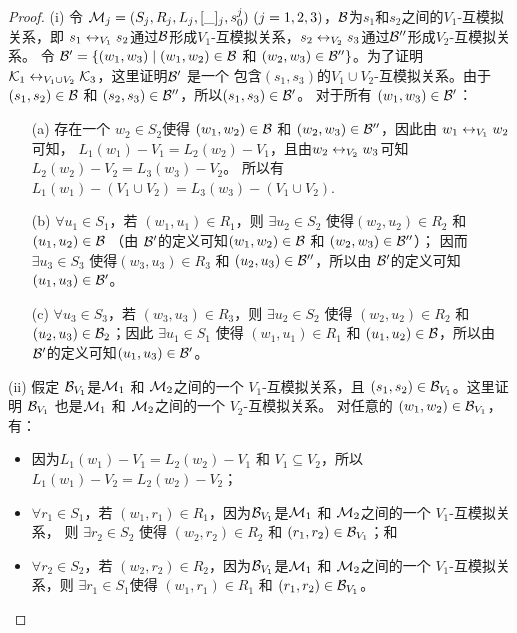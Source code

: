 \begin{proof}
	(i) 令 ${\cal M}_j=(S_j,R_j,L_j,[\_]_j,s_0^j)~(j=1,2,3)$，${\cal B}$为$s_1$和$s_2$之间的$V_1$-互模拟关系，即 $s_1 \leftrightarrow_{V_1} s_2$通过${\cal B}$形成$V_1$-互模拟关系，$s_2 \leftrightarrow_{V_2} s_3$通过${\cal B}''$形成$V_2$-互模拟关系。 令 ${\cal B}' = \{(w_1, w_3)\mid (w_1, w_2)\in {\cal B}$ 和 $(w_2, w_3)\in {\cal B}''\}$。为了证明 ${\cal K}_1\leftrightarrow_{V_1\cup V_2}{\cal K}_3$，这里证明${\cal B}'$ 是一个 包含$(s_1, s_3)$的$V_1 \cup V_2$-互模拟关系。由于$(s_1,s_2)\in {\cal B}$ 和 $(s_2, s_3)\in {\cal B}''$，所以$(s_1, s_3) \in {\cal B}'$。
	对于所有 $(w_1, w_3) \in {\cal B}'$：
	\begin{itemize}
		\item[(a)] 存在一个 $w_2 \in S_2$使得 $(w_1,w_2)\in {\cal B}$ 和 $(w_2, w_3)\in {\cal B}''$，因此由 $w_1 \leftrightarrow_{V_1} w_2$可知， $L_1(w_1)-V_1 = L_2(w_2) - V_1$，且由$w_2 \leftrightarrow_{V_2} w_3$可知 $L_2(w_2) - V_2 = L_3(w_3) - V_2$。
		所以有 $L_1(w_1) - (V_1 \cup V_2) = L_3(w_3) - (V_1 \cup V_2)$.
		\item[(b)] $\forall u_1\in S_1$，若 $(w_1, u_1) \in R_1$，则 $\exists u_2\in S_2$ 使得$(w_2, u_2) \in R_2$ 和 $(u_1,u_2)\in {\cal B}$ （由 ${\cal B}'$的定义可知$(w_1,w_2)\in {\cal B}$ 和 $(w_2, w_3) \in {\cal B}''$）； 因而 $\exists u_3 \in S_3$ 使得$(w_3, u_3) \in R_3$ 和 $(u_2, u_3) \in {\cal B}''$，所以由 ${\cal B}'$的定义可知 $(u_1, u_3) \in {\cal B}'$。
		\item[(c)] $\forall u_3\in S_3$，若 $(w_3, u_3) \in R_3$，则 $\exists u_2\in S_2$ 使得 $(w_2, u_2) \in R_2$ 和 $(u_2, u_3) \in {\cal B}_2$；因此 $\exists u_1 \in S_1$ 使得  $(w_1, u_1) \in R_1$ 和 $(u_1, u_2) \in {\cal B}$，所以由 ${\cal B}'$的定义可知$(u_1, u_3) \in {\cal B}'$。
	\end{itemize}
	
	(ii) 假定 ${\cal B}_{V_1}$是${\cal M}_1$ 和 ${\cal M}_2$之间的一个 $V_1$-互模拟关系，且 $(s_1, s_2)\in {\cal B}_{V_1}$。这里证明 ${\cal B}_{V_1}$ 也是${\cal M}_1$ 和 ${\cal M}_2$之间的一个 $V_2$-互模拟关系。
	对任意的 $(w_1, w_2) \in {\cal B}_{V_1}$，有：
	\begin{itemize}
		\item 因为$L_1(w_1) - V_1 = L_2(w_2) -V_1$ 和 $V_1 \subseteq V_2$，所以 $L_1(w_1) - V_2 = L_2(w_2) -V_2$；
		\item $\forall r_1 \in S_1$，若 $(w_1,r_1) \in R_1$，因为${\cal B}_{V_1}$是${\cal M}_1$ 和 ${\cal M}_2$之间的一个 $V_1$-互模拟关系， 则 $\exists r_2\in S_2$ 使得 $(w_2,r_2)\in R_2$ 和 $(r_1,r_2) \in {\cal B}_{V_1}$；和
		\item $\forall r_2 \in S_2$，若 $(w_2,r_2) \in R_2$，因为${\cal B}_{V_1}$是${\cal M}_1$ 和 ${\cal M}_2$之间的一个 $V_1$-互模拟关系，则 $\exists r_1\in S_1$使得 $(w_1,r_1)\in R_1$ 和 $(r_1,r_2) \in {\cal B}_{V_1}$。
	\end{itemize}
	

\end{proof}
